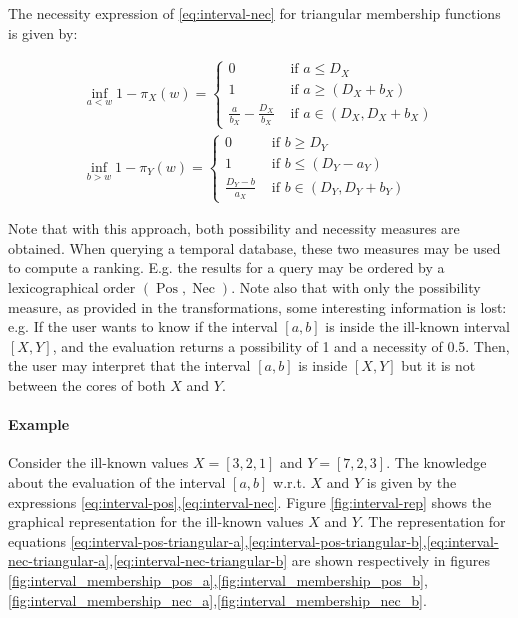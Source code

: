 \documentclass[twoside,twocolumn,a4paper]{article}
\newcommand{\Pos}{\operatorname{Pos}}
\newcommand{\Nec}{\operatorname{Nec}}
\begin{document}
The necessity expression of \eqref{eq:interval-nec} for triangular membership functions is given by:

\begin{eqnarray}
\label{eq:interval-nec-triangular-a}
\inf_{a<w}1-\pi_{X}(w)=
\begin{cases}
0 & \mbox{\ if\ } a \leq  D_X   \\
1 & \mbox{\ if\ } a \geq \left( D_X+b_X \right) \\
\frac{a}{b_X}- \frac{D_X}{b_X} & \mbox{\ if\ } a \in \left(D_X,D_X+b_X \right)
\end{cases}\\
\label{eq:interval-nec-triangular-b}
\inf_{b>w}1-\pi_{Y}(w)=
\begin{cases}
0 & \mbox{\ if\ } b \geq  D_Y \\
1 & \mbox{\ if\ } b \leq \left( D_Y - a_Y \right) \\
 \frac{D_Y-b}{a_X} & \mbox{\ if\ } b \in \left(D_Y,D_Y+b_Y \right) 
\end{cases}
\end{eqnarray}

Note that with this approach, both possibility and necessity measures are obtained. When querying a temporal database, these two measures may be used to compute a ranking. E.g. the results for a query may be ordered by a lexicographical order $(\Pos,\Nec)$. Note also that with only the possibility measure, as provided in the transformations, some interesting information is lost: e.g. If the user wants to know if the interval $[a,b]$ is inside the ill-known interval $[X,Y]$, and the evaluation returns a possibility of 1 and a necessity of 0.5.  Then, the user may interpret that the interval $[a,b]$ is inside $[X,Y]$ but it is not between the cores of both $X$ and $Y$.

\paragraph{Example} Consider the ill-known values $X = \left[3, 2, 1\right]$ and $Y = \left[7, 2, 3 \right]$. The knowledge about the evaluation of the interval $\left[a, b \right]$ w.r.t. $X$ and $Y$ is given by the expressions \eqref{eq:interval-pos},\eqref{eq:interval-nec}.  Figure \ref{fig:interval-rep} shows the graphical representation for the ill-known values $X$ and $Y$. The representation for equations \eqref{eq:interval-pos-triangular-a},\eqref{eq:interval-pos-triangular-b},\eqref{eq:interval-nec-triangular-a},\eqref{eq:interval-nec-triangular-b} are shown respectively in figures \ref{fig:interval_membership_pos_a},\ref{fig:interval_membership_pos_b},\ref{fig:interval_membership_nec_a},\ref{fig:interval_membership_nec_b}.
\end{document}
